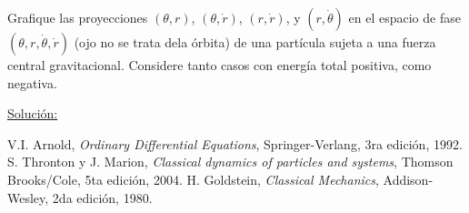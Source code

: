 \documentclass[a4paper,10pt]{article}
\numberwithin{equation}{section}
\begin{document}
Grafique las proyecciones $(\theta,r)$, $(\theta,\dot{r})$, $(r,\dot{r})$,
y $(r,\dot{\theta})$ en el espacio de fase $(\theta,r,\dot{\theta},\dot{r})$
(ojo no se trata dela órbita) de una partícula sujeta a una fuerza central 
gravitacional. Considere tanto casos con energía total positiva, como 
negativa.

\vspace{.3cm}

\underline{Solución:} \vspace{.3cm}

\begin{thebibliography}{10}
 V.I. Arnold, \emph{Ordinary Differential Equations}, Springer-Verlang,
 3ra edición, 1992.
 S. Thronton y J. Marion, \textit{Classical dynamics of particles and systems}, Thomson Brooks/Cole,
 5ta edición, 2004.
 H. Goldstein, \emph{Classical Mechanics}, Addison-Wesley, 2da edición,
 1980.
\end{thebibliography}
\end{document}
